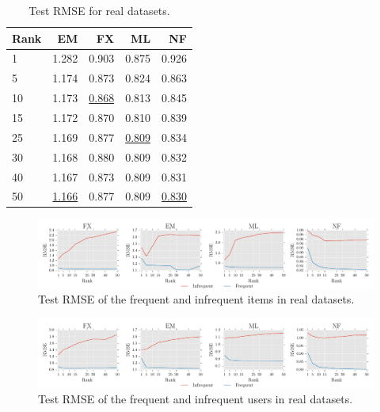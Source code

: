 \begin{table}[hbt]
\caption{Test RMSE for real datasets.}
\label{param_test_rmse}
  \begin{center}
    \begin{tabular}{lrrrr}
      \hline
      Rank & EM & FX & ML & NF \\
      \hline
      1 & 1.282 & 0.903 & 0.875 & 0.926 \\
      5 & 1.174 & 0.873 & 0.824 & 0.863 \\
     10 & 1.173 & \underline{0.868} & 0.813 & 0.845 \\
      15 & 1.172 & 0.870 & 0.810 & 0.839 \\
      25 & 1.169 & 0.877 & \underline{0.809} & 0.834 \\
      30 & 1.168 & 0.880 & 0.809 & 0.832 \\
      40 & 1.167 & 0.873 & 0.809 & 0.831 \\
      50 & \underline{1.166} & 0.877 & 0.809 & \underline{0.830} \\
      \hline
    \end{tabular}
  \end{center}
\end{table}

\begin{figure}[hbt]
  \includegraphics[scale=0.5]{figures/infreq_freq_RMSES.pdf} 
  \caption{Test RMSE of the frequent and infrequent items in real datasets.}
  \label{fig:freq_inFreq_rmse}
\end{figure}


\begin{figure}[hbt]
  \includegraphics[scale=0.5]{figures/infreq_freq_user_RMSES.pdf} 
  \caption{Test RMSE of the frequent and infrequent users in real datasets.}
  \label{fig:freq_inFreq_user_rmse}
\end{figure}

